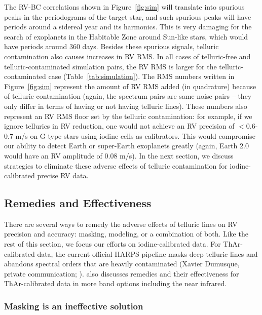 The RV-BC correlations shown in Figure~\ref{fig:sim} will
translate into spurious peaks in the periodograms of the target star,
and such spurious peaks will have periods around a sidereal year and
its harmonics. This is very damaging for the search of exoplanets in
the Habitable Zone around Sun-like stars, which would have periods
around 360 days. Besides these spurious signals, telluric
contamination also causes increases in RV RMS. In all cases of
telluric-free and telluric-contaminated simulation pairs, the RV RMS
is larger for the telluric-contaminated case
(Table~\ref{tab:simulation}). The RMS numbers written in
Figure~\ref{fig:sim} represent the amount of RV RMS added (in
quadrature) because of telluric contamination (again, the spectrum
pairs are same-noise pairs -- they only differ in terms of having or
not having telluric lines). These numbers also represent an RV RMS
floor set by the telluric contamination: for example, if we ignore
tellurics in RV reduction, one would not achieve an RV precision of
$<$0.6-0.7 m/s on G type stars using iodine cells as calibrators. This
would compromise our ability to detect Earth or super-Earth exoplanets
greatly (again, Earth 2.0 would have an RV amplitude of 0.08 m/s). In
the next section, we discuss strategies to eliminate these adverse
effects of telluric contamination for iodine-calibrated precise RV
data.


\subsection{Remedies and Effectiveness}\label{keck:telluric:remedies}

There are several ways to remedy the adverse effects of telluric lines
on RV precision and accuracy: masking, modeling, or a combination of
both. Like the rest of this section, we focus our efforts on
iodine-calibrated data. For ThAr-calibrated data, the current official
HARPS pipeline masks deep telluric lines and abandons spectral orders
that are heavily contaminated (Xavier Dumusque, private communication;
\citealt{artigau2014}). \cite{2016AAS...22713719S} also discusses
remedies and their effectiveness for ThAr-calibrated data in more band
options including the near infrared.

\subsubsection{Masking is an ineffective solution}\label{keck:telluric:masking}

